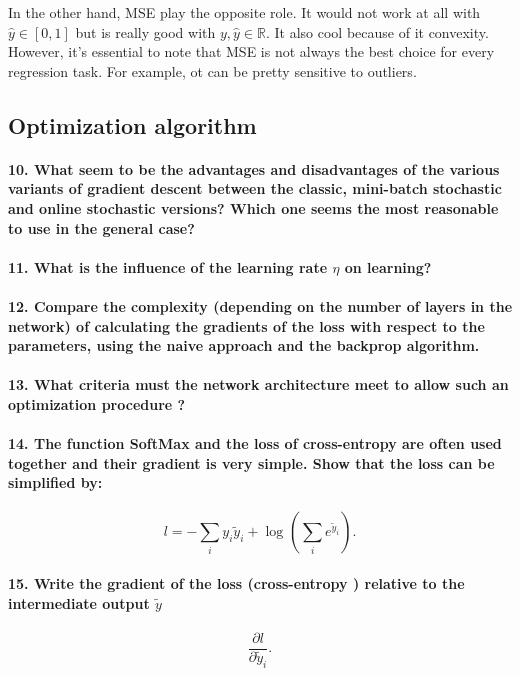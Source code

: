 \documentclass{article}
\theoremstyle{plain}%
\theoremstyle{definition}
\theoremstyle{remark}
\begin{document}
In the other hand, MSE play the opposite role. It would not work at all with $ \hat{y} \in [0,1] $ but is really good with $ y, \hat{y} \in \mathbb{R} $. It also cool because of it convexity. However, it's essential to note that MSE is not always the best choice for every regression task. For example, ot can be pretty sensitive to outliers.

\subsection{Optimization algorithm}

\paragraph{10. What seem to be the advantages and disadvantages of the various variants of gradient descent between the classic, mini-batch stochastic and online stochastic versions? Which one seems the most reasonable to use in the general case?}

\paragraph{11. What is the influence of the learning rate $ \eta  $  on learning?}
\paragraph{12. Compare the complexity (depending on the number of layers in the network) of calculating the gradients of the loss with respect to the parameters, using the naive approach and the backprop algorithm.}
\paragraph{13. What criteria must the network architecture meet to allow such an optimization procedure ?}
\paragraph{14. The function SoftMax and the loss of cross-entropy are often used together and their gradient is very simple. Show that the loss can be simpliﬁed by:}
\[
    l = - \sum_{i}^{} y_i \tilde{y}_i + \log_{} (\sum_{i}^{} e^{\tilde{y}_i}) 
.\]

\paragraph{15. Write the gradient of the loss (cross-entropy ) relative to the intermediate output $ \tilde{y} $ }
\[
    \frac{\partial l}{\partial \tilde{y}_i}
.\]
\end{document}
